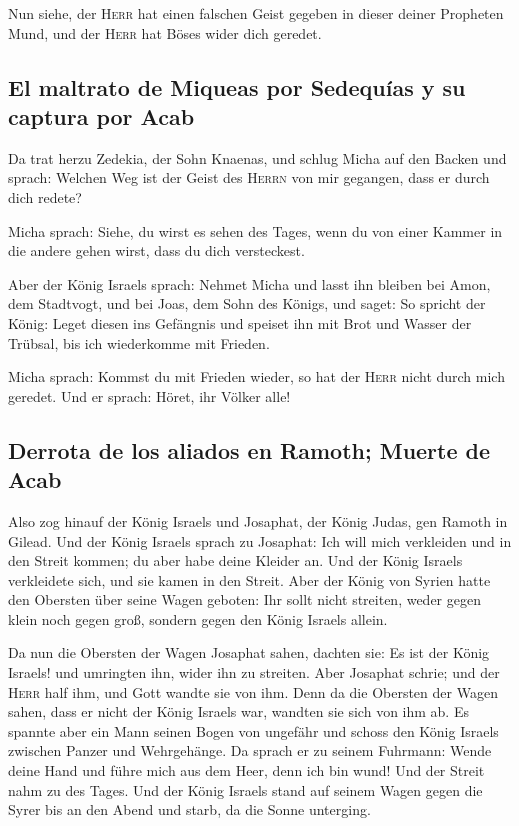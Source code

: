  Nun siehe, der \textsc{Herr} hat einen falschen Geist
gegeben in dieser deiner Propheten Mund, und der \textsc{Herr} hat Böses
wider dich geredet.

\hypertarget{el-maltrato-de-miqueas-por-sedequuxedas-y-su-captura-por-acab}{%
\subsection{El maltrato de Miqueas por Sedequías y su captura por
Acab}\label{el-maltrato-de-miqueas-por-sedequuxedas-y-su-captura-por-acab}}

 Da trat herzu Zedekia, der Sohn Knaenas, und schlug
Micha auf den Backen und sprach: Welchen Weg ist der Geist des
\textsc{Herrn} von mir gegangen, dass er durch dich redete?

 Micha sprach: Siehe, du wirst es sehen des Tages, wenn
du von einer Kammer in die andere gehen wirst, dass du dich versteckest.

 Aber der König Israels sprach: Nehmet Micha und lasst
ihn bleiben bei Amon, dem Stadtvogt, und bei Joas, dem Sohn des Königs,
 und saget: So spricht der König: Leget diesen ins
Gefängnis und speiset ihn mit Brot und Wasser der Trübsal, bis ich
wiederkomme mit Frieden.

 Micha sprach: Kommst du mit Frieden wieder, so hat der
\textsc{Herr} nicht durch mich geredet. Und er sprach: Höret, ihr Völker
alle!

\hypertarget{derrota-de-los-aliados-en-ramoth-muerte-de-acab}{%
\subsection{Derrota de los aliados en Ramoth; Muerte de
Acab}\label{derrota-de-los-aliados-en-ramoth-muerte-de-acab}}

 Also zog hinauf der König Israels und Josaphat, der
König Judas, gen Ramoth in Gilead.  Und der König Israels
sprach zu Josaphat: Ich will mich verkleiden und in den Streit kommen;
du aber habe deine Kleider an. Und der König Israels verkleidete sich,
und sie kamen in den Streit.  Aber der König von Syrien
hatte den Obersten über seine Wagen geboten: Ihr sollt nicht streiten,
weder gegen klein noch gegen groß, sondern gegen den König Israels
allein.

 Da nun die Obersten der Wagen Josaphat sahen, dachten
sie: Es ist der König Israels! und umringten ihn, wider ihn zu streiten.
Aber Josaphat schrie; und der \textsc{Herr} half ihm, und Gott wandte
sie von ihm.  Denn da die Obersten der Wagen sahen, dass
er nicht der König Israels war, wandten sie sich von ihm ab.
 Es spannte aber ein Mann seinen Bogen von ungefähr und
schoss den König Israels zwischen Panzer und Wehrgehänge. Da sprach er
zu seinem Fuhrmann: Wende deine Hand und führe mich aus dem Heer, denn
ich bin wund!  Und der Streit nahm zu des Tages. Und der
König Israels stand auf seinem Wagen gegen die Syrer bis an den Abend
und starb, da die Sonne unterging.

